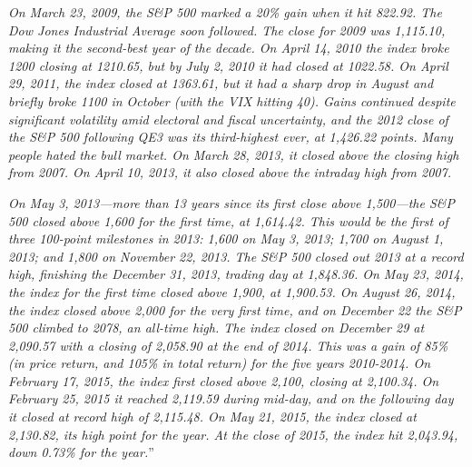 \textit{On March 23, 2009, the S\&P 500 marked a 20\% gain when it hit
  822.92. The Dow Jones Industrial Average soon followed. The close
  for 2009 was 1,115.10, making it the second-best year of the decade.
  On April 14, 2010 the index broke 1200 closing at 1210.65, but by
  July 2, 2010 it had closed at 1022.58. On April 29, 2011, the index
  closed at 1363.61, but it had a sharp drop in August and briefly
  broke 1100 in October (with the VIX hitting 40). Gains continued
  despite significant volatility amid electoral and fiscal
  uncertainty, and the 2012 close of the S\&P 500 following QE3 was
  its third-highest ever, at 1,426.22 points. Many people hated the
  bull market. On March 28, 2013, it closed above the closing high
  from 2007. On April 10, 2013, it also closed above the intraday high
  from 2007.}

\textit{On May 3, 2013—more than 13 years since its first close above
  1,500—the S\&P 500 closed above 1,600 for the first time, at
  1,614.42. This would be the first of three 100-point milestones in
  2013: 1,600 on May 3, 2013; 1,700 on August 1, 2013; and 1,800 on
  November 22, 2013. The S\&P 500 closed out 2013 at a record high,
  finishing the December 31, 2013, trading day at 1,848.36. On May 23,
  2014, the index for the first time closed above 1,900, at 1,900.53.
  On August 26, 2014, the index closed above 2,000 for the very first
  time, and on December 22 the S\&P 500 climbed to 2078, an all-time
  high. The index closed on December 29 at 2,090.57 with a closing of
  2,058.90 at the end of 2014. This was a gain of 85\% (in price
  return, and 105\% in total return) for the five years 2010-2014. On
  February 17, 2015, the index first closed above 2,100, closing at
  2,100.34. On February 25, 2015 it reached 2,119.59 during mid-day,
  and on the following day it closed at record high of 2,115.48. On
  May 21, 2015, the index closed at 2,130.82, its high point for the
  year. At the close of 2015, the index hit 2,043.94, down 0.73\% for
  the year.}''

